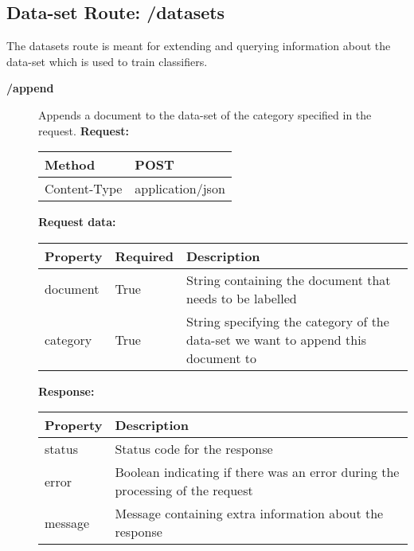 \subsection{Data-set Route: /datasets}
The datasets route is meant for extending and querying information about the data-set which is used to train classifiers. 

\begin{description}


\item [{\large \textbf{/append}}]
Appends a document to the data-set of the category specified in the request.
\newline
\newline
\textbf{Request:}
\newline
\newline
\begin{tabular}{ | l | l |}
\hline
Method & POST\\ \hline
Content-Type & application/json\\ \hline
\end{tabular}
\newline
\newline
\textbf{Request data:}
\newline
\newline
\resizebox{\textwidth}{!} {
\begin{tabular}{ | l | l | l |}
\hline
\textbf{Property} & \textbf{Required} & \textbf{Description}\\ \hline
document & True & String containing the document that needs to be labelled\\ \hline
category & True & String specifying the category of the data-set we want to append this document to\\ \hline
\end{tabular}}
\newline
\newline
\textbf{Response:}
\newline
\newline
\resizebox{\textwidth}{!} {
\begin{tabular}{ | l | l |}
\hline
\textbf{Property} & \textbf{Description}\\ \hline
status & Status code for the response\\ \hline
error & Boolean indicating if there was an error during the processing of the request\\ \hline
message & Message containing extra information about the response\\ \hline
\end{tabular}}



\end{description}
